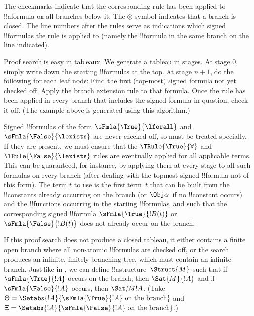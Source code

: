 \documentclass[../../../include/open-logic-section]{subfiles}
\begin{document}
The checkmarks indicate that the corresponding rule has been applied
to !!a{formula} on all branches below it. The $\otimes$ symbol
indicates that a branch is closed. The line numbers after the rules
serve as indications which signed !!{formula}s the rule is applied to
(namely the !!{formula} in the same branch on the line indicated).

Proof search is easy in tableaux. We generate a tableau in stages. At
stage $0$, simply write down the starting !!{formula}s at the top. At
stage $n+1$, do the following for each leaf node: Find the first
(top-most) signed formula not yet checked off. Apply the branch
extension rule to that formula. Once the rule has been applied in
every branch that includes the signed formula in question, check it
off. (The example above is generated using this algorithm.)

Signed !!{formula}s of the form $\sFmla{\True}{\lforall}$ and
$\sFmla{\False}{\lexists}$ are never checked off, so must be treated
specially. If they are present, we must ensure that the
$\TRule{\True}{\forall}$ and $\TRule{\False}{\lexists}$ rules are
eventually applied for all applicable terms. This can be guaranteed,
for instance, by applying them at every stage to all such formulas on
every branch (after dealing with the topmost signed !!{formula} not of
this form). The term $t$ to use is the first term~$t$ that can be
built from the !!{constant}s already occurring on the branch (or $\Obj
c_0$ if no !!{constant} occurs) and the !!{function}s occurring in the
starting !!{formula}s, and such that the corresponding signed
!!{formula} $\sFmla{\True}{!B(t)}$ or~$\sFmla{\False}{!B(t)}$ does not
already occur on the branch.

If this proof search does not produce a closed tableau, it either
contains a finite open branch where all non-atomic !!{formula}s are
checked off, or the search produces an infinite, finitely branching
tree, which must contain an infinite branch. Just like in
, we can define !!a{structure}~$\Struct{M}$ such that
if $\sFmla{\True}{!A}$ occurs on the branch, then $\Sat{M}{!A}$ and if
$\sFmla{\False}{!A}$ occurs, then $\Sat/{M}{!A}$. (Take $\Theta =
\Setabs{!A}{\sFmla{\True}{!A} \text{ on the branch}}$ and $\Xi =
\Setabs{!A}{\sFmla{\False}{!A} \text{ on the branch}}$.)
\end{document}
